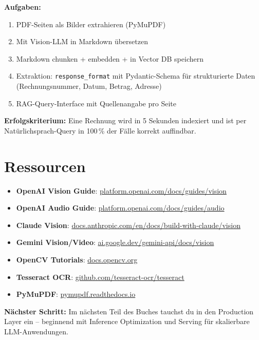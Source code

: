 \textbf{Aufgaben:}
\begin{enumerate}[leftmargin=*]
    \item PDF-Seiten als Bilder extrahieren (PyMuPDF)
    \item Mit Vision-LLM in Markdown übersetzen
    \item Markdown chunken + embedden + in Vector DB speichern
    \item Extraktion: \texttt{response\_format} mit Pydantic-Schema für strukturierte Daten (Rechnungsnummer, Datum, Betrag, Adresse)
    \item RAG-Query-Interface mit Quellenangabe pro Seite
\end{enumerate}

\textbf{Erfolgskriterium:} Eine Rechnung wird in 5 Sekunden indexiert und ist per Natürlichsprach-Query in 100\,\% der Fälle korrekt auffindbar.

\section{Ressourcen}

\begin{itemize}[leftmargin=*]
    \item \textbf{OpenAI Vision Guide}: \href{https://platform.openai.com/docs/guides/vision}{platform.openai.com/docs/guides/vision}
    \item \textbf{OpenAI Audio Guide}: \href{https://platform.openai.com/docs/guides/audio}{platform.openai.com/docs/guides/audio}
    \item \textbf{Claude Vision}: \href{https://docs.anthropic.com/en/docs/build-with-claude/vision}{docs.anthropic.com/en/docs/build-with-claude/vision}
    \item \textbf{Gemini Vision/Video}: \href{https://ai.google.dev/gemini-api/docs/vision}{ai.google.dev/gemini-api/docs/vision}
    \item \textbf{OpenCV Tutorials}: \href{https://docs.opencv.org/}{docs.opencv.org}
    \item \textbf{Tesseract OCR}: \href{https://github.com/tesseract-ocr/tesseract}{github.com/tesseract-ocr/tesseract}
    \item \textbf{PyMuPDF}: \href{https://pymupdf.readthedocs.io/}{pymupdf.readthedocs.io}
\end{itemize}

\textbf{Nächster Schritt:} Im nächsten Teil des Buches tauchst du in den Production Layer ein -- beginnend mit Inference Optimization und Serving für skalierbare LLM-Anwendungen.
